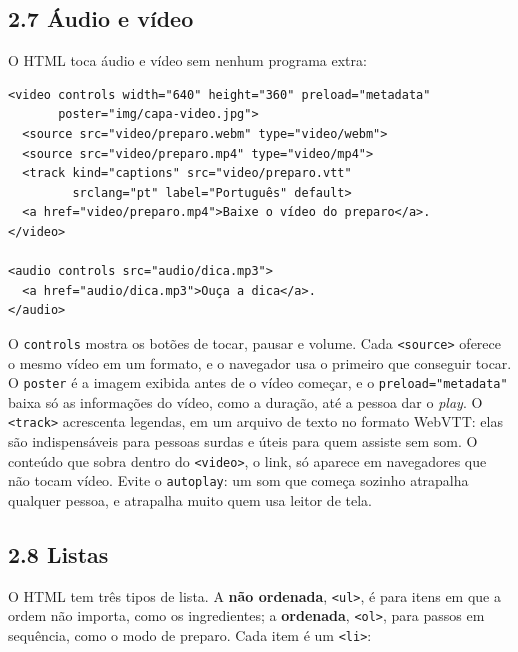 \subsection{2.7 Áudio e vídeo}

O HTML toca áudio e vídeo sem nenhum programa extra:

\begin{codigo}
\begin{Verbatim}[breaklines=true, breaksymbolleft={}, fontsize=\footnotesize]
<video controls width="640" height="360" preload="metadata"
       poster="img/capa-video.jpg">
  <source src="video/preparo.webm" type="video/webm">
  <source src="video/preparo.mp4" type="video/mp4">
  <track kind="captions" src="video/preparo.vtt"
         srclang="pt" label="Português" default>
  <a href="video/preparo.mp4">Baixe o vídeo do preparo</a>.
</video>

<audio controls src="audio/dica.mp3">
  <a href="audio/dica.mp3">Ouça a dica</a>.
</audio>
\end{Verbatim}
\end{codigo}

O \texttt{controls} mostra os botões de tocar, pausar e volume. Cada \texttt{<source>} oferece o mesmo vídeo em um formato, e o navegador usa o primeiro que conseguir tocar. O \texttt{poster} é a imagem exibida antes de o vídeo começar, e o \texttt{preload="metadata"} baixa só as informações do vídeo, como a duração, até a pessoa dar o \textit{play}. O \texttt{<track>} acrescenta legendas, em um arquivo de texto no formato WebVTT: elas são indispensáveis para pessoas surdas e úteis para quem assiste sem som. O conteúdo que sobra dentro do \texttt{<video>}, o link, só aparece em navegadores que não tocam vídeo. Evite o \texttt{autoplay}: um som que começa sozinho atrapalha qualquer pessoa, e atrapalha muito quem usa leitor de tela.

\subsection{2.8 Listas}

O HTML tem três tipos de lista. A \textbf{não ordenada}, \texttt{<ul>}, é para itens em que a ordem não importa, como os ingredientes; a \textbf{ordenada}, \texttt{<ol>}, para passos em sequência, como o modo de preparo. Cada item é um \texttt{<li>}:


